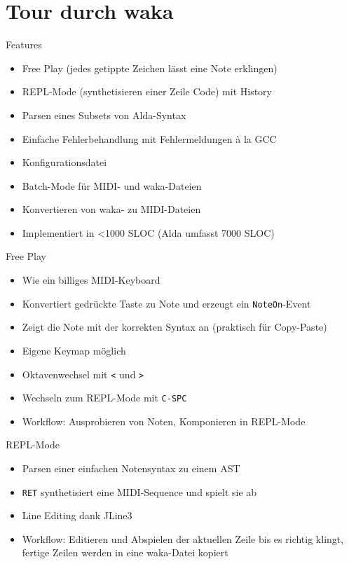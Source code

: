\documentclass[presentation]{beamer}
\begin{document}
\section{Tour durch waka}
\label{sec-4}

\begin{frame}[label=sec-4-1]{Features}
\begin{itemize}
\item Free Play (jedes getippte Zeichen lässt eine Note erklingen)
\item REPL-Mode (synthetisieren einer Zeile Code) mit History
\item Parsen eines Subsets von Alda-Syntax
\item Einfache Fehlerbehandlung mit Fehlermeldungen à la GCC
\item Konfigurationsdatei
\item Batch-Mode für MIDI- und waka-Dateien
\item Konvertieren von waka- zu MIDI-Dateien
\item Implementiert in <1000 SLOC (Alda umfasst 7000 SLOC)
\end{itemize}
\end{frame}

\begin{frame}[fragile,label=sec-4-2]{Free Play}
 \begin{itemize}
\item Wie ein billiges MIDI-Keyboard
\item Konvertiert gedrückte Taste zu Note und erzeugt ein \texttt{NoteOn}-Event
\item Zeigt die Note mit der korrekten Syntax an (praktisch für Copy-Paste)
\item Eigene Keymap möglich
\item Oktavenwechsel mit \texttt{<} und \texttt{>}
\item Wechseln zum REPL-Mode mit \texttt{C-SPC}
\item Workflow: Ausprobieren von Noten, Komponieren in REPL-Mode
\end{itemize}
\end{frame}

\begin{frame}[fragile,label=sec-4-3]{REPL-Mode}
 \begin{itemize}
\item Parsen einer einfachen Notensyntax zu einem AST
\item \texttt{RET} synthetisiert eine MIDI-Sequence und spielt sie ab
\item Line Editing dank JLine3
\item Workflow: Editieren und Abspielen der aktuellen Zeile bis es richtig
klingt, fertige Zeilen werden in eine waka-Datei kopiert
\end{itemize}
\end{frame}
\end{document}
